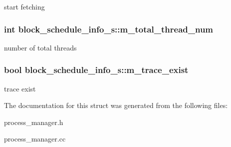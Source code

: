 \label{structblock__schedule__info__s_a2a94ce096712373fc57cde8da942cb28}
start fetching \hypertarget{structblock__schedule__info__s_abbc67ac8b7a9a0bdc964d6b9a5a4c8d0}{
\subsubsection[{m\_\-total\_\-thread\_\-num}]{\setlength{\rightskip}{0pt plus 5cm}int {\bf block\_\-schedule\_\-info\_\-s::m\_\-total\_\-thread\_\-num}}}
\label{structblock__schedule__info__s_abbc67ac8b7a9a0bdc964d6b9a5a4c8d0}
number of total threads \hypertarget{structblock__schedule__info__s_a82e2fd882d6e6269a567e2d421bf0f27}{
\subsubsection[{m\_\-trace\_\-exist}]{\setlength{\rightskip}{0pt plus 5cm}bool {\bf block\_\-schedule\_\-info\_\-s::m\_\-trace\_\-exist}}}
\label{structblock__schedule__info__s_a82e2fd882d6e6269a567e2d421bf0f27}
trace exist 

The documentation for this struct was generated from the following files:\begin{DoxyCompactItemize}
\item 
process\_\-manager.h\item 
process\_\-manager.cc\end{DoxyCompactItemize}
